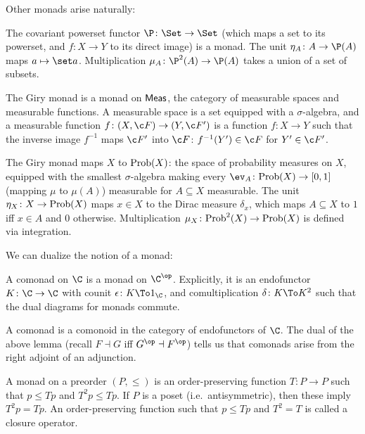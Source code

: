 \eexam

\bexam

    Other monads arise naturally:
    \benum
        \item The covariant powerset functor $\P\colon\Set\to\Set$ (which maps a set to its powerset, and $f\colon X\to Y$ to its direct image) is a monad.
        The unit $\eta_A\colon A\to\P(A)$ maps $a\mapsto\set a$.
        Multiplication $\mu_A\colon\P^2(A)\to\P(A)$ takes a union of a set of subsets.

        \item The {\emphcolor Giry monad} is a monad on ${\sf Meas}$, the category of measurable spaces and measurable functions.
        A measurable space is a set equipped with a $\sigma$-algebra, and a measurable function $f\colon(X,\c F)\to(Y,\c F')$ is a function $f\colon X\to Y$
        such that the inverse image $f^{-1}$ maps $\c F'$ into $\c F$: $f^{-1}(Y')\in\c F$ for $Y'\in\c F'$.

        The Giry monad maps $X$ to ${\rm Prob}(X)$: the space of probability measures on $X$, equipped with the smallest $\sigma$-algebra making every
        $\ev_A\colon{\rm Prob}(X)\to[0,1]$ (mapping $\mu$ to $\mu(A)$) measurable for $A\subseteq X$ measurable.
        The unit $\eta_X\colon X\to{\rm Prob}(X)$ maps $x\in X$ to the Dirac measure $\delta_x$, which maps $A\subseteq X$ to $1$ iff $x\in A$ and $0$ otherwise.
        Multiplication $\mu_X\colon{\rm Prob}^2(X)\to{\rm Prob}(X)$ is defined via integration.
    \eenum

\eexam

We can dualize the notion of a monad:

\bdefn

    A {\emphcolor comonad} on $\C$ is a monad on $\C^\op$.
    Explicitly, it is an endofunctor $K\colon\C\to\C$ with counit $\epsilon\colon K\To1_\C$, and comultiplication $\delta\colon K\To K^2$ such that the dual
    diagrams for monads commute.

\edefn

A comonad is a comonoid in the category of endofunctors of $\C$.
The dual of the above lemma (recall $F\dashv G$ iff $G^\op\dashv F^\op$) tells us that comonads arise from the right adjoint of an adjunction.

\bexam

    A monad on a preorder $(P,\leq)$ is an order-preserving function $T\colon P\to P$ such that $p\leq Tp$ and $T^2p\leq Tp$.
    If $P$ is a poset (i.e.\ antisymmetric), then these imply $T^2p=Tp$.
    An order-preserving function such that $p\leq Tp$ and $T^2=T$ is called a {\emphcolor closure operator}.

